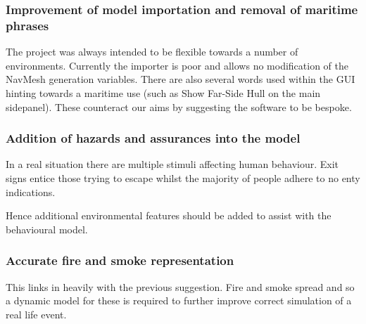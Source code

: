 \subsubsection*{Improvement of model importation and removal of maritime phrases}

The project was always intended to be flexible towards a number of
environments. Currently the importer is poor and allows no modification
of the NavMesh generation variables. There are also several words
used within the GUI hinting towards a maritime use (such as Show Far-Side
Hull on the main sidepanel). These counteract our aims by suggesting
the software to be bespoke.


\subsubsection*{Addition of hazards and assurances into the model}

In a real situation there are multiple stimuli affecting human behaviour.
Exit signs entice those trying to escape whilst the majority of people
adhere to no enty indications.

Hence additional environmental features should be added to assist
with the behavioural model.


\subsubsection*{Accurate fire and smoke representation}

This links in heavily with the previous suggestion. Fire and smoke
spread and so a dynamic model for these is required to further improve
correct simulation of a real life event.
